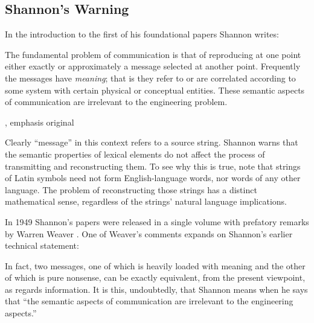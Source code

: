 \documentclass[12pt]{article}
\begin{document}

\subsection{Shannon's Warning}\label{subsec:warning}

In the introduction to the first of his foundational papers Shannon writes:

\begin{myquote}
The fundamental problem of communication is that of reproducing at one point either exactly or approximately a message selected at another point. Frequently the messages have \emph{meaning}; that is they refer to or are correlated according to some system with certain physical or conceptual entities. These semantic aspects of communication are irrelevant to the engineering problem.
\par\hspace*{\fill}\citet[379]{shannon1948mathematicalc}, emphasis original
\end{myquote}

\noindent Clearly ``message'' in this context refers to a source string.
Shannon warns that the semantic properties of lexical elements do not affect the process of transmitting and reconstructing them.
To see why this is true, note that strings of Latin symbols need not form English-language words, nor words of any other language.
The problem of reconstructing those strings has a distinct mathematical sense, regardless of the strings' natural language implications.

In 1949 Shannon's papers were released in a single volume with prefatory remarks by Warren Weaver \citep{shannon1949mathematical}.
One of Weaver's comments expands on Shannon's earlier technical statement:

\begin{myquote}
In fact, two messages, one of which is heavily loaded with meaning and the other of which is pure nonsense, can be exactly equivalent, from the present viewpoint, as regards information. It is this, undoubtedly, that Shannon means when he says that ``the semantic aspects of communication are irrelevant to the engineering aspects.''
\par\hspace*{\fill}\citet[8]{shannon1949mathematical}
\end{myquote}
\end{document}
